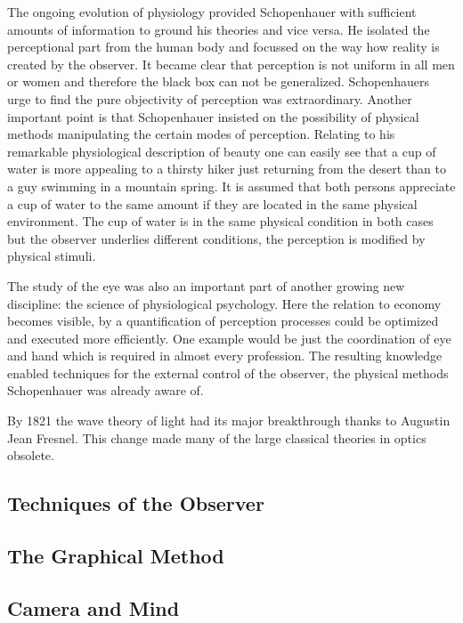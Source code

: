 \documentclass[12pt,a4paper]{article}
\begin{document}
The ongoing evolution of physiology provided Schopenhauer with sufficient amounts of information to
ground his theories and vice versa. He isolated the perceptional part from the human body and
focussed on the way how reality is created by the observer. It became clear that perception is not
uniform in all men or women and therefore the black box can not be generalized. Schopenhauers urge to
find the pure objectivity of perception was extraordinary. Another important point is that
Schopenhauer insisted on the possibility of physical methods manipulating the certain modes of
perception. Relating to his remarkable physiological description of beauty one can easily see that
a cup of water is more appealing to a thirsty hiker just returning from the desert than to a
guy swimming in a mountain spring. It is assumed that both persons appreciate a cup of water to
the same amount if they are located in the same physical environment.
The cup of water is in the same physical condition in both cases but the observer underlies different
conditions, the perception is modified by physical stimuli.

The study of the eye was also an important part of another growing new discipline: the science of
physiological psychology. Here the relation to economy becomes visible, by a quantification of
perception processes could be optimized and executed more efficiently. One example would be just the
coordination of eye and hand which is required in almost every profession. The resulting
knowledge enabled techniques for the external control of the observer, the physical methods
Schopenhauer was already aware of.

By 1821 the wave theory of light had its major breakthrough thanks to Augustin Jean Fresnel.
This change made many of the large classical theories in optics obsolete.

\newpage

\subsection*{Techniques of the Observer}

\subsection*{The Graphical Method}

\subsection*{Camera and Mind}


\newpage



\end{document}
